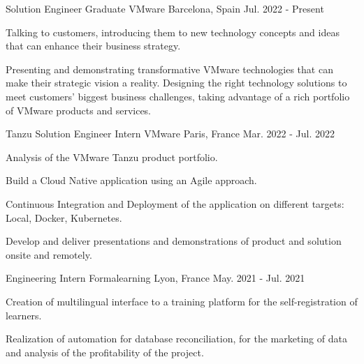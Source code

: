

\begin{cventries}

  \cventry
    {Solution Engineer Graduate} %
    {VMware} %
    {Barcelona, Spain} %
    {Jul. 2022 - Present} %
    {
      \begin{cvitems} %
        \item {Talking to customers, introducing them to new technology concepts and ideas that can enhance their business strategy.}
        \item {Presenting and demonstrating transformative VMware technologies that can make their strategic vision a reality. Designing the right technology solutions to meet customers' biggest business challenges, taking advantage of a rich portfolio of VMware products and services.}
      \end{cvitems}
    }

  \cventry
    {Tanzu Solution Engineer Intern} %
    {VMware} %
    {Paris, France} %
    {Mar. 2022 - Jul. 2022} %
    {
      \begin{cvitems} %
        \item {Analysis of the VMware Tanzu product portfolio.}
        \item {Build a Cloud Native application using an Agile approach.}
        \item {Continuous Integration and Deployment of the application on different targets: Local, Docker, Kubernetes.}
        \item {Develop and deliver presentations and demonstrations of product and solution onsite and remotely.}
      \end{cvitems}
    }

  \cventry
    {Engineering Intern} %
    {Formalearning} %
    {Lyon, France} %
    {May. 2021 - Jul. 2021} %
    {
      \begin{cvitems} %
        \item {Creation of multilingual interface to a training platform for the self-registration of learners.}
        \item {Realization of automation for database reconciliation, for the marketing of data and analysis of the profitability of the project.}
      \end{cvitems}
    }


\end{cventries}
